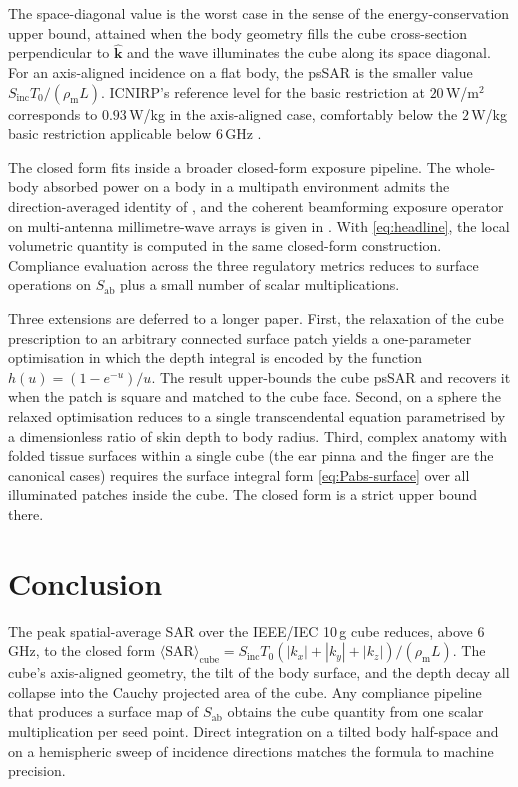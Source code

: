 \documentclass[journal,twocolumn,10pt]{IEEEtran}
\theoremstyle{plain}
\theoremstyle{remark}
\newcommand{\khat}{\hat{\bm{k}}}
\newcommand{\Sinc}{S_{\mathrm{inc}}}
\newcommand{\Sab}{S_{\mathrm{ab}}}
\newcommand{\rhom}{\rho_{\mathrm{m}}}
\begin{document}
The space-diagonal value is the worst case in the sense of the
energy-conservation upper bound, attained when the body geometry
fills the cube cross-section perpendicular to $\khat$ and the wave
illuminates the cube along its space diagonal. For an axis-aligned
incidence on a flat body, the psSAR is the smaller value
$\Sinc T_0 / (\rhom L)$. ICNIRP's reference level for the basic
restriction at $20\,$W/m$^2$ corresponds to $0.93\,$W/kg in the
axis-aligned case, comfortably below the $2\,$W/kg basic restriction
applicable below 6\,GHz \cite{ICNIRP2020}.

The closed form fits inside a broader closed-form exposure
pipeline. The whole-body absorbed power on a body in a multipath
environment admits the direction-averaged identity of
\cite{WydaegheTAP_B}, and the coherent beamforming exposure operator
on multi-antenna millimetre-wave arrays is given in
\cite{WydaegheTWC}. With \eqref{eq:headline}, the local volumetric
quantity is computed in the same closed-form construction.
Compliance evaluation across the three regulatory metrics reduces to
surface operations on $\Sab$ plus a small number of scalar
multiplications.

Three extensions are deferred to a longer paper. First, the
relaxation of the cube prescription to an arbitrary connected
surface patch yields a one-parameter optimisation in which the
depth integral is encoded by the function $h(u) = (1-e^{-u})/u$.
The result upper-bounds the cube psSAR and recovers it when the
patch is square and matched to the cube face. Second, on a sphere
the relaxed optimisation reduces to a single transcendental
equation parametrised by a dimensionless ratio of skin depth to
body radius. Third, complex anatomy with folded tissue surfaces
within a single cube (the ear pinna and the finger are the
canonical cases) requires the surface integral form
\eqref{eq:Pabs-surface} over all illuminated patches inside the
cube. The closed form is a strict upper bound there.


\section{Conclusion}\label{sec:conc}

The peak spatial-average SAR over the IEEE/IEC 10\,g cube reduces,
above 6\,GHz, to the closed form
$\langle\mathrm{SAR}\rangle_{\mathrm{cube}}
= \Sinc T_0 (|k_x| + |k_y| + |k_z|) / (\rhom L)$. The cube's
axis-aligned geometry, the tilt of the body surface, and the depth
decay all collapse into the Cauchy projected area of the cube. Any
compliance pipeline that produces a surface map of $\Sab$ obtains
the cube quantity from one scalar multiplication per seed point.
Direct integration on a tilted body half-space and on a hemispheric
sweep of incidence directions matches the formula to machine
precision.




\end{document}
